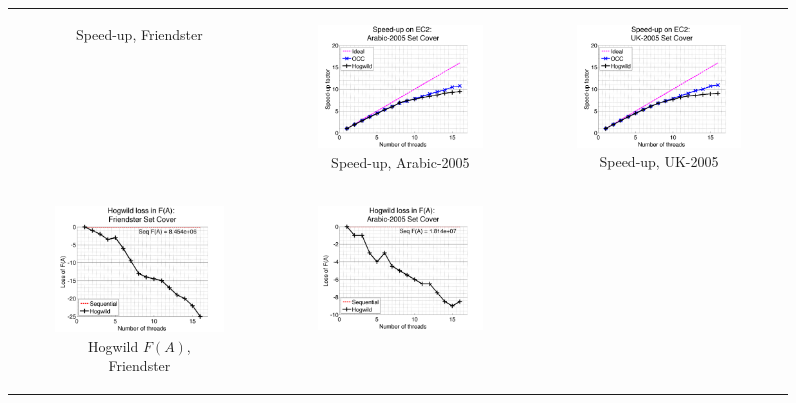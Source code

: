 \begin{figure}[ht]
\begin{tabular}{ccc}
\begin{subfigure}[b]{0.31\textwidth}
			\caption{Speed-up, Friendster}
			\label{appfig:speedup_friendster10M_setcover}
	  \end{subfigure} &
	  \begin{subfigure}[b]{0.31\textwidth}
	  	\includegraphics[width=150pt]{images/speedup_arabic2005_setcover.png}
			\caption{Speed-up, Arabic-2005}
			\label{appfig:speedup_arabic2005_setcover}
	  \end{subfigure} &
	  \begin{subfigure}[b]{0.31\textwidth}
	  	\includegraphics[width=150pt]{images/speedup_uk2005_setcover.png}
			\caption{Speed-up, UK-2005}
			\label{appfig:speedup_uk2005_setcover}
	  \end{subfigure} \\
	  \begin{subfigure}[b]{0.31\textwidth}
	  	\includegraphics[width=150pt]{images/diffFA_Hogwild_friendster10M_setcover.png}
			\caption{Hogwild $F(A)$, Friendster}
			\label{appfig:diffFA_Hogwild_friendster10M_setcover}
	  \end{subfigure} &
	  \begin{subfigure}[b]{0.31\textwidth}
	  	\includegraphics[width=150pt]{images/diffFA_Hogwild_arabic2005_setcover.png}

\end{subfigure}
\end{tabular}
\end{figure}
